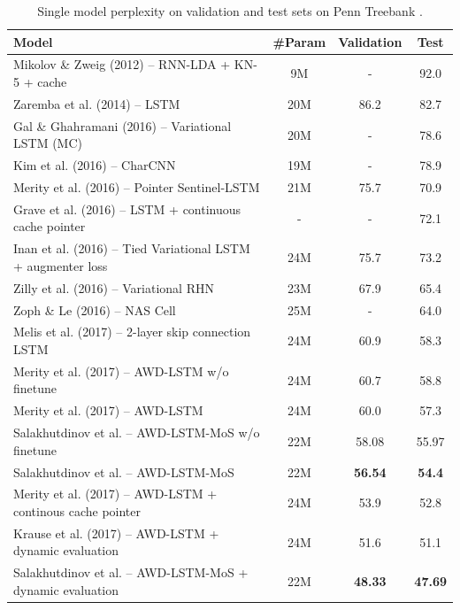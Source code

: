 \documentclass{IEEEtran}
\begin{document}
\begin{table}[!t]
\caption{Single model perplexity on validation and test sets on Penn Treebank \cite{Salakhutdinov2017Softmax}.}
\label{tab:softmax}
\centering
\begin{tabular}{ l|c c c }
\toprule
\textbf{Model} & \textbf{#Param} & \textbf{Validation} & \textbf{Test} \\
\hline
Mikolov \& Zweig (2012) -- RNN-LDA + KN-5 + cache & 9M & - & 92.0 \\
Zaremba et al. (2014) -- LSTM & 20M & 86.2 & 82.7 \\
Gal \& Ghahramani (2016) -- Variational LSTM (MC) & 20M & - & 78.6 \\
Kim et al. (2016) -- CharCNN & 19M & - & 78.9 \\
Merity et al. (2016) -- Pointer Sentinel-LSTM & 21M & 75.7 & 70.9 \\
Grave et al. (2016) -- LSTM + continuous cache pointer & - & - & 72.1 \\
Inan et al. (2016) -- Tied Variational LSTM + augmenter loss & 24M & 75.7 & 73.2 \\
Zilly et al. (2016) -- Variational RHN & 23M & 67.9 & 65.4 \\
Zoph \& Le (2016) -- NAS Cell & 25M & - & 64.0 \\
Melis et al. (2017) -- 2-layer skip connection LSTM & 24M & 60.9 & 58.3 \\
\hline
Merity et al. (2017) -- AWD-LSTM w/o finetune & 24M & 60.7 & 58.8 \\
Merity et al. (2017) -- AWD-LSTM & 24M & 60.0 & 57.3 \\
Salakhutdinov et al. \cite{Salakhutdinov2017Softmax} -- AWD-LSTM-MoS w/o finetune & 22M & 58.08 & 55.97 \\
Salakhutdinov et al. \cite{Salakhutdinov2017Softmax} -- AWD-LSTM-MoS & 22M & \textbf{56.54} & \textbf{54.4} \\
\hline
Merity et al. (2017) -- AWD-LSTM + continous cache pointer & 24M & 53.9 & 52.8 \\
Krause et al. (2017) -- AWD-LSTM + dynamic evaluation & 24M & 51.6 & 51.1 \\
Salakhutdinov et al. \cite{Salakhutdinov2017Softmax} -- AWD-LSTM-MoS + dynamic evaluation & 22M & \textbf{48.33} & \textbf{47.69} \\
\bottomrule
\end{tabular}
\end{table}
\end{document}
